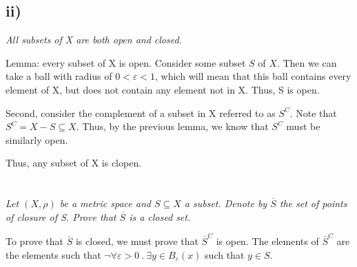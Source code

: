\documentclass[]{article}
\begin{document}
		\subsection*{ii)}
			\textit{All subsets of X are both open and closed.}


			Lemma: every subset of X is open. Consider some subset $S$ of $X$. Then we can take a ball with radius of $0 < \varepsilon < 1$, which will mean that this ball contains every element of X, but does not contain any element not in X. Thus, S is open. 

			Second, consider the complement of a subset in X referred to as $S^C$. Note that $S^C = X - S \subseteq X$. Thus, by the previous lemma, we know that $S^C$ must be similarly open. 

			Thus, any subset of X is clopen.  


	\section{}
		\textit{Let $(X, \rho)$ be a metric space and $S \subseteq X$ a subset. Denote by $\overline{S}$ the set of points of closure of S. Prove that $\overline{S}$ is a closed set.}


		To prove that $\overline{S}$ is closed, we must prove that $\overline{S}^C$ is open. The elements of $\overline{S}^C$ are the elements such that $\lnot \forall \varepsilon > 0\ .\ \exists y \in B_\varepsilon(x)$ such that $y \in S$. 
\end{document}
